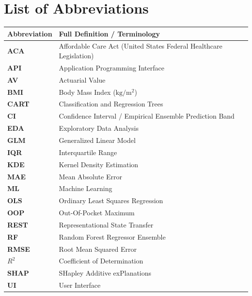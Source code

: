 \documentclass[12pt,a4paper]{report}
\begin{document}
\chapter*{List of Abbreviations}

\vspace{6mm}
\noindent
\begin{center}
\begin{tabular}{p{3.5cm} p{11.0cm}}
\hline
\textbf{Abbreviation} & \textbf{Full Definition / Terminology} \\
\hline
\textbf{ACA} & Affordable Care Act (United States Federal Healthcare Legislation) \\
\textbf{API} & Application Programming Interface \\
\textbf{AV} & Actuarial Value \\
\textbf{BMI} & Body Mass Index ($\text{kg}/\text{m}^2$) \\
\textbf{CART} & Classification and Regression Trees \\
\textbf{CI} & Confidence Interval / Empirical Ensemble Prediction Band \\
\textbf{EDA} & Exploratory Data Analysis \\
\textbf{GLM} & Generalized Linear Model \\
\textbf{IQR} & Interquartile Range \\
\textbf{KDE} & Kernel Density Estimation \\
\textbf{MAE} & Mean Absolute Error \\
\textbf{ML} & Machine Learning \\
\textbf{OLS} & Ordinary Least Squares Regression \\
\textbf{OOP} & Out-Of-Pocket Maximum \\
\textbf{REST} & Representational State Transfer \\
\textbf{RF} & Random Forest Regressor Ensemble \\
\textbf{RMSE} & Root Mean Squared Error \\
\textbf{$R^2$} & Coefficient of Determination \\
\textbf{SHAP} & SHapley Additive exPlanations \\
\textbf{UI} & User Interface \\
\hline
\end{tabular}
\end{center}

\clearpage

\setcounter{page}{1}
\end{document}

